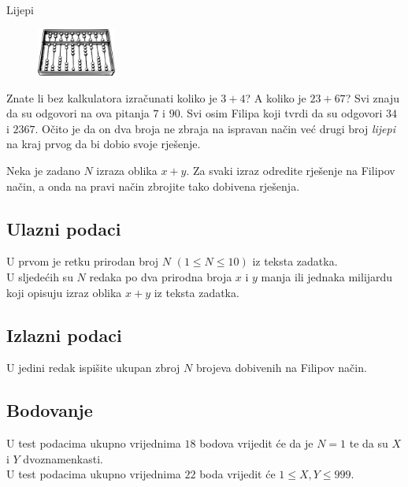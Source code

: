 \begin{statement}[
  problempoints=30,
  timelimit=1 sekunda,
  memorylimit=512 MiB,
]{Lijepi}

\setlength\intextsep{-0.1cm}
\begin{figure}
\centering
\includegraphics[width=0.23\textwidth]{img/abacus.png}
\end{figure}

Znate li bez kalkulatora izračunati koliko je $3+4$? A koliko je $23+67$? Svi
znaju da su odgovori na ova pitanja $7$ i $90$. Svi osim Filipa koji tvrdi da
su odgovori $34$ i $2367$. Očito je da on dva broja ne zbraja na ispravan način
već drugi broj \textit{lijepi} na kraj prvog da bi dobio svoje rješenje.

Neka je zadano $N$ izraza oblika $x+y$. Za svaki izraz odredite rješenje na
Filipov način, a onda na pravi način zbrojite tako dobivena rješenja.

\subsection*{Ulazni podaci}
U prvom je retku prirodan broj $N$ $(1 \le N \le 10)$ iz teksta zadatka. \\
U sljedećih su $N$ redaka po dva prirodna broja $x$ i $y$ manja ili jednaka
milijardu koji opisuju izraz oblika $x+y$ iz teksta zadatka.

\subsection*{Izlazni podaci}
U jedini redak ispišite ukupan zbroj $N$ brojeva dobivenih na Filipov način.

\subsection*{Bodovanje}
U test podacima ukupno vrijednima $18$ bodova vrijedit će da je $N=1$ te da su
$X$ i $Y$ dvoznamenkasti. \\
U test podacima ukupno vrijednima $22$ boda vrijedit će $1 \le X, Y \le 999$.


\end{statement}

